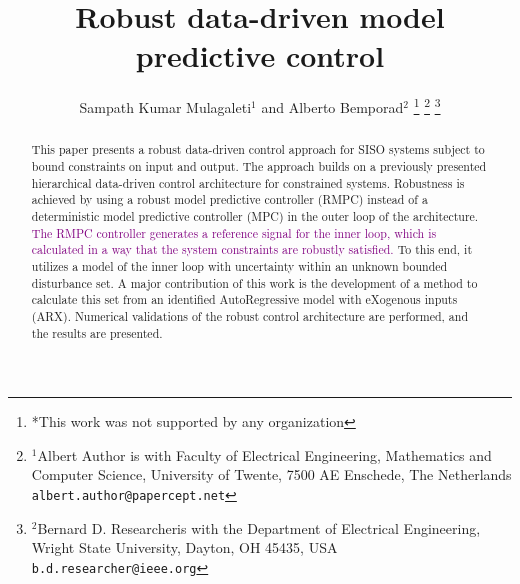 \documentclass[letterpaper, 10 pt, conference]{ieeeconf}  %
\title{\LARGE \bf
Robust data-driven model predictive control
}
\author{Sampath Kumar Mulagaleti$^{1}$ and Alberto Bemporad$^{2}$%
\thanks{*This work was not supported by any organization}%
\thanks{$^{1}$Albert Author is with Faculty of Electrical Engineering, Mathematics and Computer Science,
        University of Twente, 7500 AE Enschede, The Netherlands
        {\tt\small albert.author@papercept.net}}%
\thanks{$^{2}$Bernard D. Researcheris with the Department of Electrical Engineering, Wright State University,
        Dayton, OH 45435, USA
        {\tt\small b.d.researcher@ieee.org}}%
}
\begin{document}
\maketitle
\thispagestyle{empty}
\pagestyle{empty}


\begin{abstract}

This paper presents a robust data-driven control approach for SISO systems subject to bound constraints on input and output.
 The approach builds on a previously presented hierarchical data-driven control architecture for constrained systems. Robustness is achieved by using a robust model predictive controller (RMPC) instead of a deterministic model predictive controller (MPC) in the outer loop of the architecture. \textcolor{purple}{The RMPC controller generates a reference signal for the inner loop, which is calculated in a way that the system constraints are robustly satisfied.} To this end, it utilizes a model of the inner loop with uncertainty within an unknown bounded disturbance set. A major contribution of this work is the development of a method to calculate this set from an identified AutoRegressive model with eXogenous inputs (ARX). Numerical validations of the robust control architecture are performed, and the results are presented.

\end{abstract}


\end{document}
